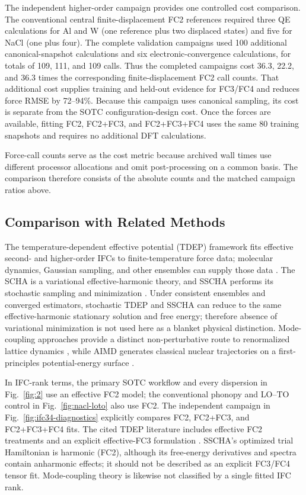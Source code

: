 \documentclass[aps,prb,reprint,amsmath,amssymb,floatfix]{revtex4-2}
\begin{document}
The independent higher-order campaign provides one controlled cost comparison.
The conventional central finite-displacement FC2 references required three QE
calculations for Al and W (one reference plus two displaced states) and five for
NaCl (one plus four). The complete validation campaigns used 100 additional
canonical-snapshot calculations and six electronic-convergence calculations,
for totals of 109, 111, and 109 calls. Thus the completed campaigns cost 36.3,
22.2, and 36.3 times the corresponding finite-displacement FC2 call counts.
That additional cost supplies training and held-out evidence for FC3/FC4 and
reduces force RMSE by 72--94\%. Because this campaign uses canonical sampling,
its cost is separate from the SOTC configuration-design cost. Once
the forces are available, fitting FC2, FC2+FC3, and FC2+FC3+FC4 uses the same
80 training snapshots and requires no additional DFT calculations.

Force-call counts serve as the cost metric because archived wall times use
different processor allocations and omit post-processing on a common basis.
The comparison therefore consists of the absolute counts and the matched
campaign ratios above.

\subsection{Comparison with Related
Methods}\label{comparison-with-related-methods}

The temperature-dependent effective potential (TDEP) framework fits effective
second- and higher-order IFCs to finite-temperature force data; molecular
dynamics, Gaussian sampling, and other ensembles can supply those data
\cite{ref5,ref6,ref10,ref52}. The SCHA is a variational effective-harmonic
theory, and SSCHA performs its stochastic sampling and minimization
\cite{ref7,ref8,ref50}. Under consistent ensembles and converged estimators,
stochastic TDEP and SSCHA can reduce to the same effective-harmonic stationary
solution and free energy; therefore absence of variational minimization is not
used here as a blanket physical distinction. Mode-coupling approaches provide a
distinct non-perturbative route to renormalized lattice dynamics \cite{ref51},
while AIMD generates classical nuclear trajectories on a first-principles
potential-energy surface \cite{ref9}.

In IFC-rank terms, the primary SOTC workflow and every dispersion in
Fig.~\ref{fig:2} use an effective FC2 model; the conventional phonopy and
LO--TO control in Fig.~\ref{fig:nacl-loto} also use FC2. The independent
campaign in Fig.~\ref{fig:ifc34-diagnostics} explicitly compares FC2,
FC2+FC3, and FC2+FC3+FC4 fits. The cited TDEP literature includes effective
FC2 treatments \cite{ref5,ref6} and an explicit effective-FC3 formulation
\cite{ref52}. SSCHA's optimized trial Hamiltonian is harmonic (FC2), although
its free-energy derivatives and spectra contain anharmonic effects; it should
not be described as an explicit FC3/FC4 tensor fit. Mode-coupling theory is
likewise not classified by a single fitted IFC rank.
\end{document}
